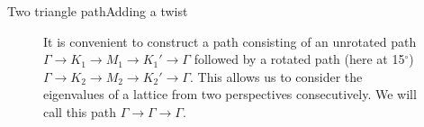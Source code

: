 \documentclass[9pt]{beamer}
\begin{document}
\begin{frame}{Two triangle path}{Adding a twist}
  \begin{figure}
  \centering
    \caption{It is convenient to construct a path consisting of an unrotated path $\Gamma \rightarrow K_1 \rightarrow M_1 \rightarrow K_1' \rightarrow \Gamma$ followed by a rotated path (here at 15$^\circ$)  $\Gamma \rightarrow K_2 \rightarrow M_2 \rightarrow K_2' \rightarrow \Gamma$. This allows us to consider the eigenvalues of a lattice from two perspectives consecutively. We will call this path $\Gamma \rightarrow \Gamma \rightarrow \Gamma$.}
  \end{figure}
\end{frame}
\end{document}
